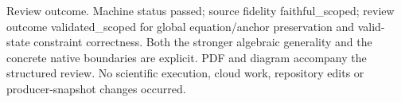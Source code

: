 \documentclass[10pt]{article}
\begin{document}
Review outcome. Machine status passed; source fidelity faithful\_scoped; review outcome validated\_scoped for global equation/anchor preservation and valid-state constraint correctness. Both the stronger algebraic generality and the concrete native boundaries are explicit. PDF and diagram accompany the structured review. No scientific execution, cloud work, repository edits or producer-snapshot changes occurred.\par\medskip
\end{document}
